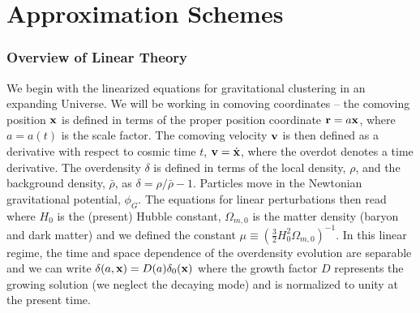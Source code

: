 \chapter{Approximation Schemes}
\subsection{Overview of Linear Theory}
We begin with the linearized equations for gravitational clustering in an expanding Universe. We will be working in comoving coordinates -- the comoving position $\mathbf x$ is defined in terms of the proper position coordinate $\mathbf r = a\mathbf x$, where $a=a(t)$ is the scale factor. The comoving velocity $\mathbf v$ is then defined as a derivative with respect to cosmic time $t$, $\mathbf v = \dot{\mathbf x}$, where the overdot denotes a time derivative. The overdensity $\delta$ is defined in terms of the local density, $\rho$, and the background density, $\bar\rho$,  as $\delta=\rho/\bar\rho-1$. Particles move in the Newtonian gravitational potential, $\phi_G$. The equations for linear perturbations then read
where $H_0$ is the (present) Hubble constant, $\Omega_{m, 0}$ is the matter density (baryon and dark matter) and we defined the constant $\mu\equiv\left(\frac32 H_0^2\Omega_{m, 0}\right)^{-1}$. In this linear regime, the time and space dependence of the overdensity evolution are separable and we can write $\delta(a, \mathbf x)=D(a)\delta_0(\mathbf x)$ where the growth factor $D$ represents the growing solution (we neglect the decaying mode) and is normalized to unity at the present time.


